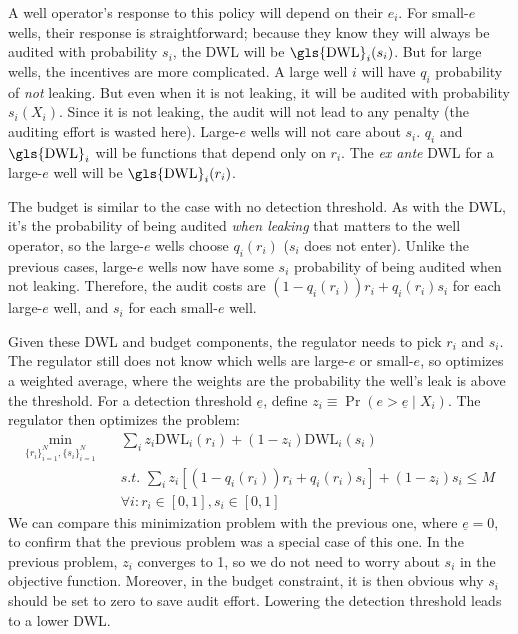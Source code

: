 \documentclass[12pt,oneside,letterpaper]{article}
\theoremstyle{definition}
\begin{document}
\begin{refsection}
A well operator's response to this policy will depend on their \(e_i\).
For small-\(e\) wells, their response is straightforward; because they know they will always be audited with probability $s_i$, the \gls{DWL} will be $\text{\gls{DWL}}_i(s_i)$.
But for large wells, the incentives are more complicated.
A large well $i$ will have $q_i$ probability of \textit{not} leaking.
But even when it is not leaking, it will be audited with probability $s_i(X_i)$. Since it is not leaking, the audit will not lead to any penalty
(the auditing effort is wasted here).
Large-\(e\) wells will not care about $s_i$.
$q_i$ and $\text{\gls{DWL}}_i$ will be functions that depend only on $r_i$.
The \textit{ex ante} \gls{DWL} for a large-\(e\) well will be
$\text{\gls{DWL}}_i(r_i)$.

The budget is similar to the case with no detection threshold.
As with the \gls{DWL}, it's the probability of being audited \emph{when leaking} that matters to the well operator, so the large-$e$ wells choose \(q_i(r_i)\) (\(s_i\) does not enter).
Unlike the previous cases, large-$e$ wells now have some \(s_i\) probability of being audited when not leaking.
Therefore, the audit costs are \((1 - q_i(r_i)) r_i + q_i(r_i) s_i\) for each large-$e$ well, and \(s_i\) for each small-$e$ well.

Given these \gls{DWL} and budget components, the regulator needs to pick \(r_i\) and \(s_i\).
The regulator still does not know which wells are large-\(e\) or small-\(e\), so optimizes a weighted average, where the weights are the probability the well's leak is above the threshold.
For a detection threshold \(\underline{e}\), define
\(z_i \equiv \Pr(e > \underline{e} \mid X_i)\).
The regulator then optimizes the problem:
\begin{align*}
\min_{
\{r_i\}_{i = 1} ^ N, \{s_i\}_{i = 1} ^ N
} \quad &
\sum_i
z_i  \text{DWL}_i(r_i) +
(1 - z_i ) \text{DWL}_i(s_i)\\
&\textit{s.t. }
\sum_i
z_i [(1 - q_i(r_i)) r_i + q_i(r_i) s_i] +
(1 - z_i) s_i
\leq M\\
&\forall i: r_i \in [0, 1], s_i \in [0, 1]
\end{align*}
We can compare this minimization problem with the previous one, where \(\underline{e} = 0\), to confirm that the previous problem was a special case of this one.
In the previous problem, $z_i$ converges to 1, so we do not need to worry about $s_i$ in the objective function.
Moreover, in the budget constraint, it is then obvious why $s_i$ should be set to zero to save audit effort.
Lowering the detection threshold leads to a lower \gls{DWL}.



\end{refsection}
\end{document}

